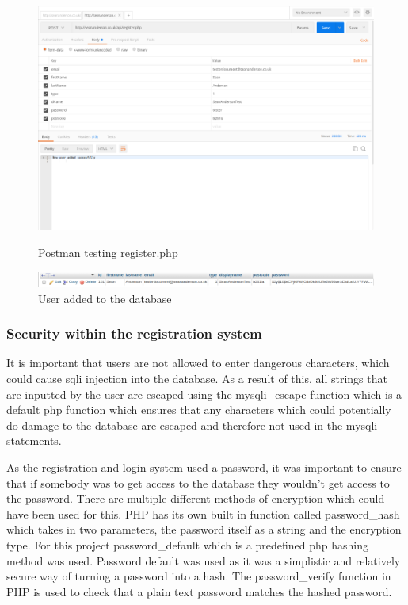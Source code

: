 \begin{center} 
\begin{figure}[H]
\includegraphics[scale=0.45]{images/postman}
\caption{Postman testing register.php}
\includegraphics[scale=0.45]{images/db1}
\caption{User added to the database}
\end{figure}
\end{center}

\subsubsection{Security within the registration system}
It is important that users are not allowed to enter dangerous characters, which could cause sqli injection into the database. As a result of this, all strings that are inputted by the user are escaped using the mysqli\_escape function which is a default php function which ensures that any characters which could potentially do damage to the database are escaped and therefore not used in the mysqli statements.

As the registration and login system used a password, it was important to ensure that if somebody was to get access to the database they wouldn't get access to the password. There are multiple different methods of encryption which could have been used for this. PHP has its own built in function called password\_hash which takes in two parameters, the password itself as a string and the encryption type. For this project password\_default which is a predefined php hashing method was used. Password default was used as it was a simplistic and relatively secure way of turning a password into a hash. The password\_verify function in PHP is used to check that a plain text password matches the hashed password.
 
